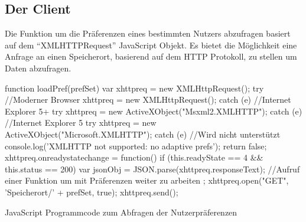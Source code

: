 \documentclass[12pt, paper=a4, bibtotoc, toc=listof, headsepline=true]{scrreprt}
\begin{document}
\subsection{Der Client}
Die Funktion um die Präferenzen eines bestimmten Nutzers abzufragen basiert auf dem \enquote{XMLHTTPRequest} JavaScript Objekt. Es bietet die Möglichkeit eine Anfrage an einen Speicherort, basierend auf dem \ac{HTTP} Protokoll, zu stellen um Daten abzufragen.
\begin{listing}
	\begin{JavaScriptcode*}{}
function loadPref(prefSet) {
   var xhttpreq = new XMLHttpRequest();
   try{
      //Moderner Browser
      xhttpreq = new XMLHttpRequest();
   }catch (e){
      //Internet Explorer 5+
      try{
         xhttpreq = new ActiveXObject("Msxml2.XMLHTTP");
      }catch (e) {
         //Internet Explorer 5
         try{
            xhttpreq = new ActiveXObject("Microsoft.XMLHTTP");
         }catch (e){
             //Wird nicht unterstützt
             console.log('XMLHTTP not supported: no adaptive prefs');
             return false;
         }
      }
   }
   xhttpreq.onreadystatechange = function() {
      if (this.readyState == 4 && this.status == 200) {
         var jsonObj = JSON.parse(xhttpreq.responseText);
         //Aufruf einer Funktion um mit Präferenzen weiter zu arbeiten
      }
   };
   xhttpreq.open("GET", 'Speicherort/' + prefSet, true);
   xhttpreq.send(); 	
}
	\end{JavaScriptcode*}
	\caption[Abfragen der Nutzerpräferenzen]{JavaScript Programmcode zum Abfragen der Nutzerpräferenzen}
	\label{lst:jquAja}
\end{listing}
\end{document}
